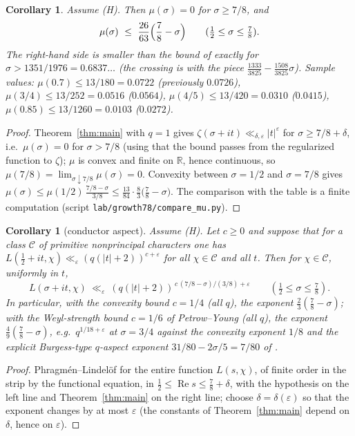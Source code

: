 \documentclass[11pt]{article}
\newtheorem{corollary}[theorem]{Corollary}
\renewcommand{\Re}{\operatorname{Re}}
\begin{document}
\begin{corollary}\label{cor:mu}
Assume (H). Then $\mu(\sigma)=0$ for $\sigma\ge7/8$, and
\[
\mu(\sigma)\ \le\ \frac{26}{63}\Bigl(\frac78-\sigma\Bigr)\qquad(\tfrac12\le\sigma\le\tfrac78).
\]
The right-hand side is smaller than the bound of \cite[Table~6.2]{ANTEDB} exactly for $\sigma>1351/1976=0.6837\ldots$ (the crossing is with the piece $\tfrac{1333}{3825}-\tfrac{1508}{3825}\sigma$). Sample values: $\mu(0.7)\le13/180=0.0722$ (previously $0.0726$), $\mu(3/4)\le13/252=0.0516$ ($0.0564$), $\mu(4/5)\le13/420=0.0310$ ($0.0415$), $\mu(0.85)\le13/1260=0.0103$ ($0.0272$).
\end{corollary}
\begin{proof}
Theorem~\ref{thm:main} with $q=1$ gives $\zeta(\sigma+it)\ll_{\delta,\varepsilon}|t|^{\varepsilon}$ for $\sigma\ge7/8+\delta$, i.e.\ $\mu(\sigma)=0$ for $\sigma>7/8$ (using that the bound passes from the regularized function to $\zeta$); $\mu$ is convex \cite[Lemma~6.3]{ANTEDB} and finite on $\mathbb R$, hence continuous, so $\mu(7/8)=\lim_{\sigma\downarrow7/8}\mu(\sigma)=0$. Convexity between $\sigma=1/2$ and $\sigma=7/8$ gives $\mu(\sigma)\le\mu(1/2)\,\frac{7/8-\sigma}{3/8}\le\frac{13}{84}\cdot\frac83\bigl(\tfrac78-\sigma\bigr)$. The comparison with the table is a finite computation (script \texttt{lab/growth78/compare\_mu.py}).
\end{proof}

\begin{corollary}[conductor aspect]\label{cor:q}
Assume (H). Let $c\ge0$ and suppose that for a class $\mathcal C$ of primitive nonprincipal characters one has $L(\tfrac12+it,\chi)\ll_\varepsilon(q(|t|+2))^{c+\varepsilon}$ for all $\chi\in\mathcal C$ and all $t$. Then for $\chi\in\mathcal C$, uniformly in $t$,
\[
L(\sigma+it,\chi)\ \ll_{\varepsilon}\ (q(|t|+2))^{\,c\,(7/8-\sigma)/(3/8)+\varepsilon}\qquad(\tfrac12\le\sigma\le\tfrac78).
\]
In particular, with the convexity bound $c=1/4$ (all $q$), the exponent $\tfrac23(\tfrac78-\sigma)$; with the Weyl-strength bound $c=1/6$ of Petrow--Young \cite{PY23} (all $q$), the exponent $\tfrac49(\tfrac78-\sigma)$, e.g.\ $q^{1/18+\varepsilon}$ at $\sigma=3/4$ against the convexity exponent $1/8$ and the explicit Burgess-type $q$-aspect exponent $31/80-2\sigma/5=7/80$ of \cite[Thm.~1.3]{Fra22}.
\end{corollary}
\begin{proof}
Phragm\'en--Lindel\"of for the entire function $L(s,\chi)$, of finite order in the strip by the functional equation, in $\tfrac12\le\Re s\le\tfrac78+\delta$, with the hypothesis on the left line and Theorem~\ref{thm:main} on the right line; choose $\delta=\delta(\varepsilon)$ so that the exponent changes by at most $\varepsilon$ (the constants of Theorem~\ref{thm:main} depend on $\delta$, hence on $\varepsilon$).
\end{proof}
\end{document}
